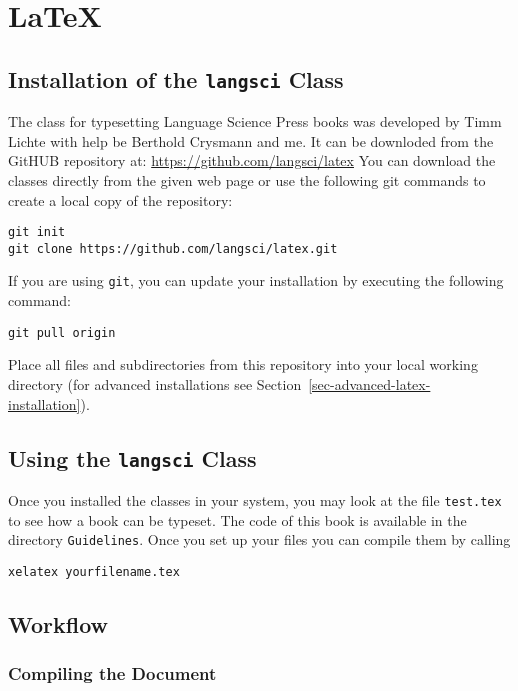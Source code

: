 \chapter{\LaTeX}

\section{Installation of the \texttt{langsci} Class}

The \latex class for typesetting Language Science Press books was developed by Timm Lichte with
help be Berthold Crysmann and me. It can be downloded from the GitHUB repository at: \url{https://github.com/langsci/latex}
You can download the classes directly from the given web page or use the following git commands to
create a local copy of the repository:
\begin{verbatim}
git init
git clone https://github.com/langsci/latex.git 
\end{verbatim}
If you are using \texttt{git}, you can update your installation by executing the following command:
\begin{verbatim}
git pull origin
\end{verbatim}

Place all files and subdirectories from this repository into your local working directory (for
advanced installations see Section~\ref{sec-advanced-latex-installation}).

\section{Using the \texttt{langsci} Class}

Once you installed the classes in your system, you may look at the file \texttt{test.tex} to see how
a book can be typeset. The code of this book is available in the directory \texttt{Guidelines}. Once
you set up your \latex files you can compile them by calling 
\begin{verbatim}
xelatex yourfilename.tex
\end{verbatim}


\section{Workflow}

\subsection{Compiling the Document}

